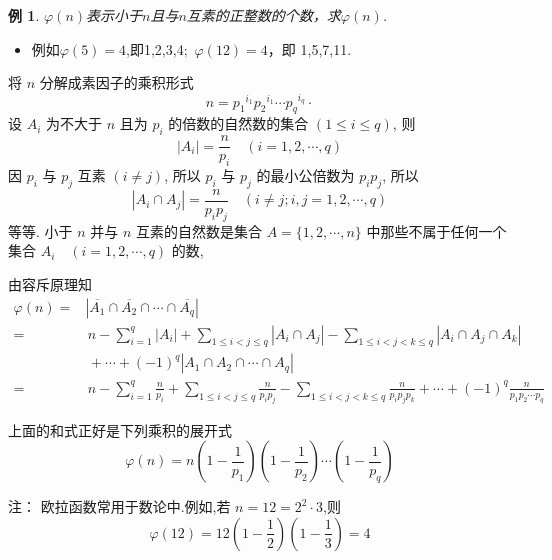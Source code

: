 \documentclass[punct]{ctexbeamer}
\newtheorem{ex}{例}
\def\sol{\noindent {\bf 解\ }}
\begin{document}
\begin{frame}
	\begin{ex}
		$\varphi (n)$表示小于$n$且与$n$互素的正整数的个数，求$\varphi (n)$.
	\end{ex}

	\begin{itemize}
		\item 例如$\varphi (5)=4$,即1,2,3,4;\ $\varphi (12)=4$，即 1,5,7,11.
	\end{itemize}

\pause
\sol
将 $n$ 分解成素因子的乘积形式
$$
n=p_{1}{ }^{i_{1}} p_{2}{ }^{i_{1}} \cdots p_{q}{ }^{i_q} \cdot
$$
设 $A_{i}$ 为不大于 $n$ 且为 $p_{i}$ 的倍数的自然数的集合 $(1 \leqslant i \leqslant q)$, 则
$$
\left|A_{i}\right|=\frac{n}{p_{i}} \quad(i=1,2, \cdots, q)
$$
因 $p_{i}$ 与 $p_{j}$ 互素 $(i \neq j)$, 所以 $p_{i}$ 与 $p_{j}$ 的最小公倍数为 $p_{i} p_{j}$, 所以
$$
\left|A_{i} \cap A_{j}\right|=\frac{n}{p_{i} p_{j}} \quad(i \neq j ; i, j=1,2, \cdots, q)
$$
等等. 小于 $n$ 并与 $n$ 互素的自然数是集合 $A=\{1,2, \cdots, n\}$ 中那些不属于任何一个 集合 $A_{i} \quad(i=1,2, \cdots, q)$ 的数,


\end{frame}



\begin{frame}
由容斥原理知
$$
\begin{aligned}
    \varphi(n)=&\left|\overline{A_{1}} \cap \overline{A_{2}} \cap \cdots \cap \overline{A_{q}}\right| \\
    =& \, n-\sum_{i=1}^{q}\left|A_{i}\right|+\sum_{1 \leqslant i<j \leqslant q}\left|A_{i} \cap A_{j}\right| -\sum_{1 \leqslant i<j<k \leqslant q}\left|A_{i} \cap A_{j} \cap A_{k}\right| \\
    & \,+  \cdots +(-1)^{q}\left|A_{1} \cap A_{2} \cap \cdots \cap A_{q}\right| \\
    =& \, n-\sum_{i=1}^{q} \frac{n}{p_{i}}+\sum_{1 \leqslant i<j \leqslant q} \frac{n}{p_{i} p_{j}}-\sum_{1 \leqslant i<j<k \leqslant q} \frac{n}{p_{i} p_{j} p_{k}} +\cdots+(-1)^{q} \frac{n}{p_{1} p_{2} \cdots p_{q}}
\end{aligned}
$$

上面的和式正好是下列乘积的展开式
$$
\varphi(n)=n\left(1-\frac{1}{p_{1}}\right)\left(1-\frac{1}{p_{2}}\right) \cdots\left(1-\frac{1}{p_{q}}\right)
$$


注：
欧拉函数常用于数论中.例如,若 $n=12=2^{2} \cdot 3$,则
$$
\varphi(12)=12\left(1-\frac{1}{2}\right)\left(1-\frac{1}{3}\right)=4
$$
\end{frame}
\end{document}
